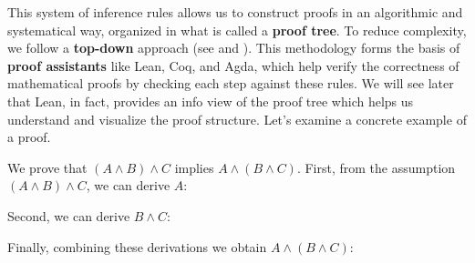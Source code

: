 This system of inference rules allows us to construct proofs in an 
algorithmic and systematical way, organized in what is called a \textbf{proof tree}. 
To reduce complexity, we follow a 
\textbf{top-down} approach (see \cite{thompson1999types} and 
\cite{nordstrom1990programming}).
This methodology forms the basis of \textbf{proof assistants} like Lean, 
Coq, and Agda, which help 
verify the correctness of mathematical proofs by checking each step 
against these rules.
We will see later that Lean, in fact, provides an info view of the proof tree 
which helps us 
understand and visualize 
the proof structure.
Let's examine a concrete example of a proof.
\begin{example}
We prove that $(A \land B) \land C$ implies $A \land (B \land C)$.
First, from the assumption $(A \land B) \land C$, we can derive $A$:
\begin{prooftree}
\end{prooftree}
Second, we can derive $B \land C$:
\begin{prooftree}
\end{prooftree}
Finally, combining these derivations we obtain $A \land (B \land C)$:
\begin{prooftree}
\end{prooftree}
\end{example}
